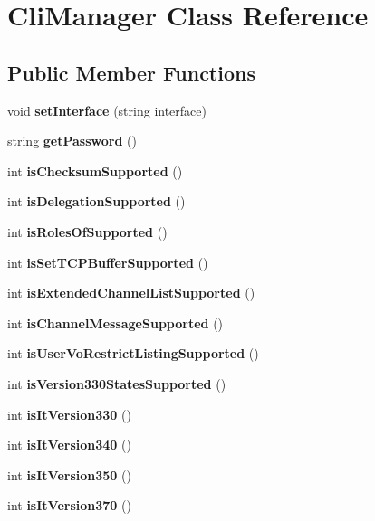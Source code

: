 \section{CliManager Class Reference}
\label{classCliManager}
\subsection*{Public Member Functions}
\begin{DoxyCompactItemize}
\item 
void {\bfseries setInterface} (string interface)\label{classCliManager_a608657d968ef29d26ca94b648ce31f21}

\item 
string {\bfseries getPassword} ()\label{classCliManager_a1120fd8ff83eced525df8c1d9b6f5808}

\item 
int {\bfseries isChecksumSupported} ()\label{classCliManager_a6a8aa8dd522167c43a869baf2c637ce4}

\item 
int {\bfseries isDelegationSupported} ()\label{classCliManager_a207cc6e6311fe97c9b9a2d1a068ae916}

\item 
int {\bfseries isRolesOfSupported} ()\label{classCliManager_ab6f5ece0cd572e80fc17abee344cd54e}

\item 
int {\bfseries isSetTCPBufferSupported} ()\label{classCliManager_a680689bce96ce643070b45c0fb909eec}

\item 
int {\bfseries isExtendedChannelListSupported} ()\label{classCliManager_a44116782069f1ab850b141f18be6b663}

\item 
int {\bfseries isChannelMessageSupported} ()\label{classCliManager_a2c8f5f265a9e59fc8c536de77a47794b}

\item 
int {\bfseries isUserVoRestrictListingSupported} ()\label{classCliManager_a79e6f679e6720ac08a6384cfbc5aaa94}

\item 
int {\bfseries isVersion330StatesSupported} ()\label{classCliManager_ab07e406b612ba34b3e0cb473427395e5}

\item 
int {\bfseries isItVersion330} ()\label{classCliManager_a52b71857143a64320b869225aad3402f}

\item 
int {\bfseries isItVersion340} ()\label{classCliManager_a6bee47c816344138811a7665054b8f60}

\item 
int {\bfseries isItVersion350} ()\label{classCliManager_a7f7fd2ff29c5a95b3ddb5c2dd2240d48}

\item 
int {\bfseries isItVersion370} ()\label{classCliManager_a2a2705c7296217728ab0c4c93151c972}

\end{DoxyCompactItemize}
